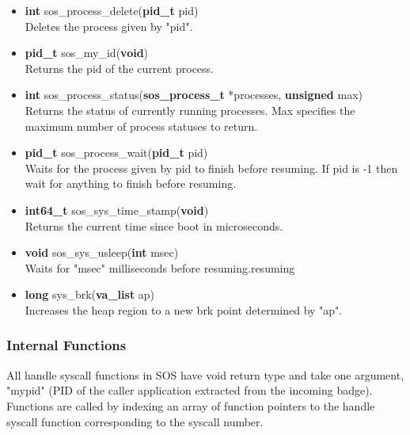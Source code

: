 \documentclass[12pt]{article}
\begin{document}
\begin{itemize}
\item \textbf{int} sos\_process\_delete(\textbf{pid\_t} pid)\\
Deletes the process given by "pid".
\item \textbf{pid\_t} sos\_my\_id(\textbf{void})\\
Returns the pid of the current process.
\item \textbf{int} sos\_process\_status(\textbf{sos\_process\_t} *processes, \textbf{unsigned} max)\\
Returns the status of currently running processes. Max specifies the maximum number of process statuses to return.
\item \textbf{pid\_t} sos\_process\_wait(\textbf{pid\_t} pid)\\
Waits for the process given by pid to finish before resuming. If pid is -1 then wait for anything to finish before resuming.
\item \textbf{int64\_t} sos\_sys\_time\_stamp(\textbf{void})\\
Returns the current time since boot in microseconds.
\item \textbf{void} sos\_sys\_usleep(\textbf{int} msec)\\
Waits for "msec" milliseconds before resuming.resuming
\item \textbf{long} sys\_brk(\textbf{va\_list} ap)\\
Increases the heap region to a new brk point determined by "ap".
\end{itemize}
\subsubsection{Internal Functions}
All handle syscall functions in SOS have void return type and take one argument, "mypid" (PID of the caller application extracted from the incoming badge). Functions are called by indexing an array of function pointers to the handle syscall function corresponding to the syscall number.
\end{document}
